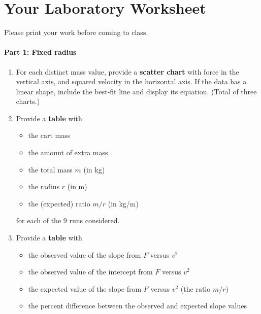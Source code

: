 \section{Your Laboratory Worksheet}
%
Please print your work before coming to class.
%
\paragraph{Part 1: Fixed radius}
%
\begin{enumerate}
    \item For each distinct mass value, provide a \textbf{scatter chart} with force in the vertical axis, and squared velocity in the horizontal axis. If the data has a linear shape, include the best-fit line and display its equation. (Total of three charts.)
    \item Provide a \textbf{table} with
    \begin{itemize}
        \item the cart mass
        \item the amount of extra mass
        \item the total mass $m$ (in kg)
        \item the radius $r$ (in m)
        \item the (expected) ratio $m/r$ (in kg/m)
    \end{itemize}
    for each of the 9 runs considered.
    \item Provide a \textbf{table} with
    \begin{itemize}
        \item the observed value of the slope from $F$ versus $v^{2}$
        \item the observed value of the intercept from $F$ versus $v^{2}$
        \item the expected value of the slope from $F$ versus $v^{2}$ (the ratio $m/r$)
        \item the percent difference between the observed and expected slope values
    \end{itemize}
\end{enumerate}
%
